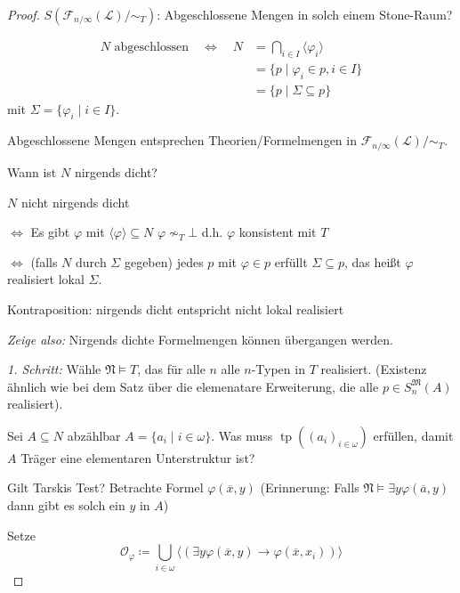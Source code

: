 \documentclass[12pt,parskip=full]{scrartcl}
\theoremstyle{definition}
\begin{document}
	\begin{proof}
		$S(\mathcal{F}_{n/\infty}(\mathcal{L})/\sim_T)$: Abgeschlossene Mengen in solch einem Stone-Raum?
		
		\begin{align*}
			N \text{ abgeschlossen} \quad\Leftrightarrow\quad N &= \bigcap_{i \in I} \langle \varphi_i \rangle \\
			&= \{ p \mid \varphi_i \in p, i \in I \} \\
			&= \{ p \mid \Sigma \subseteq p \}
		\end{align*}
		mit $\Sigma = \{ \varphi_i \mid i \in I \}$.
		
		Abgeschlossene Mengen entsprechen Theorien/Formelmengen in $\mathcal{F}_{n/\infty}(\mathcal{L}) / \sim_T$.
		
		Wann ist $N$ nirgends dicht?
		
		$N$ nicht nirgends dicht
		
		$\Leftrightarrow$ Es gibt $\varphi$ mit $\langle \varphi \rangle \subseteq N$ $\varphi \nsim_T \bot$ d.h. $\varphi$ konsistent mit $T$
		
		$\Leftrightarrow$ (falls $N$ durch $\Sigma$ gegeben) jedes $p$ mit $\varphi \in p$ erfüllt $\Sigma \subseteq p$, das heißt $\varphi$ realisiert lokal $\Sigma$.
		
		Kontraposition: nirgends dicht entspricht nicht lokal realisiert
		
		\textit{Zeige also:} Nirgends dichte Formelmengen können übergangen werden.
		
		\textit{1. Schritt:} Wähle $\mathfrak{N} \models T$, das für alle $n$ alle $n$-Typen in $T$ realisiert. (Existenz ähnlich wie bei dem Satz über die elemenatare Erweiterung, die alle $p \in S_n^\mathfrak{M}(A)$ realisiert).
		
		Sei $A \subseteq N$ abzählbar $A = \{ a_i \mid i \in \omega \}$. Was muss $\operatorname{tp}((a_i)_{i \in \omega})$ erfüllen, damit $A$ Träger eine elementaren Unterstruktur ist?
		
		Gilt Tarskis Test? Betrachte Formel $\varphi(\overline{x}, y)$ (Erinnerung: Falls $\mathfrak{N} \models \exists y \varphi(\overline{a}, y)$ dann gibt es solch ein $y$ in $A$)
		
		Setze
		\begin{equation*}
			\mathcal{O}_\varphi \coloneqq \bigcup_{i \in \omega} \langle (\exists y \varphi(\overline{x}, y) \to \varphi(\overline{x}, x_i)) \rangle
		\end{equation*}
		

\end{proof}
\end{document}
